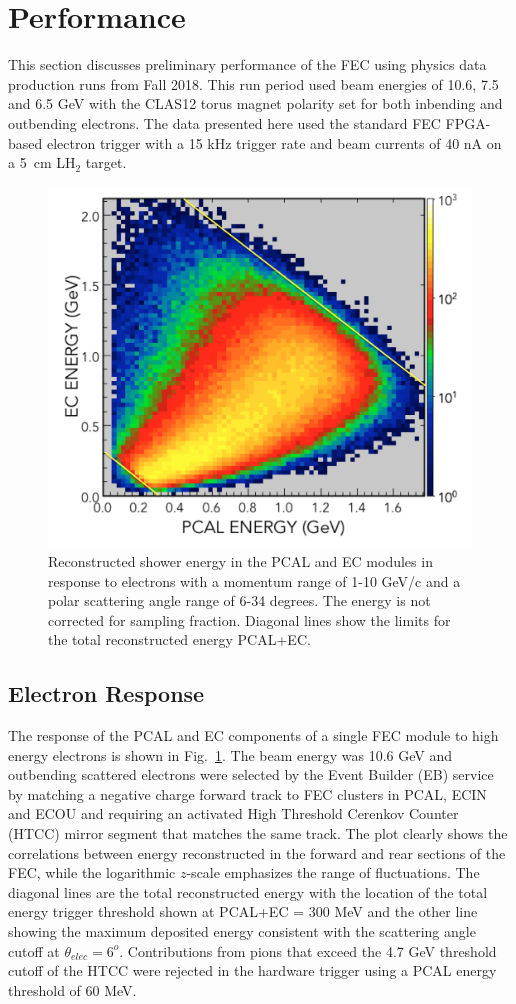 \section{Performance} \label{Performance}

This section discusses preliminary performance of the FEC using physics data production runs from Fall 2018.  This run period used beam energies of 10.6, 7.5 and 6.5 GeV with the CLAS12 torus magnet polarity set for both inbending and outbending electrons.  The data presented here used the standard FEC FPGA-based electron trigger with a 15 kHz trigger rate and beam currents of 40 nA on a 5~cm LH$_2$ target.

\begin{figure}[t]
\centering
\includegraphics[width=0.8\columnwidth,keepaspectratio]{img/S10_1_000.png}
\caption[]{Reconstructed shower energy in the PCAL and EC modules in response to electrons with a momentum range of 1-10 GeV/c and a polar scattering angle range of 6-34 degrees.  The energy is not corrected for sampling fraction. Diagonal lines show the limits for the total reconstructed energy PCAL+EC.}
\label{fig:S10_1_000}
\end{figure}

\subsection{Electron Response}
The response of the PCAL and EC components of a single FEC module to high energy electrons is shown in Fig.~\ref{fig:S10_1_000}.  The beam energy was 10.6 GeV and outbending scattered electrons were selected by the Event Builder (EB) service by matching a negative charge forward track to FEC clusters in PCAL, ECIN and ECOU and requiring an activated High Threshold Cerenkov Counter (HTCC) mirror segment that matches the same track.  The plot clearly shows the correlations between energy reconstructed in the forward and rear sections of the FEC, while the logarithmic $z$-scale emphasizes the range of fluctuations. The diagonal lines are the total reconstructed  energy with the location of the total energy trigger threshold shown at PCAL+EC = 300 MeV and the other line showing the maximum deposited energy consistent with the scattering angle cutoff at $\theta_{elec}=6^o$. Contributions from pions that exceed the 4.7 GeV threshold cutoff of the HTCC were rejected in the hardware trigger using a PCAL energy threshold of 60 MeV.

